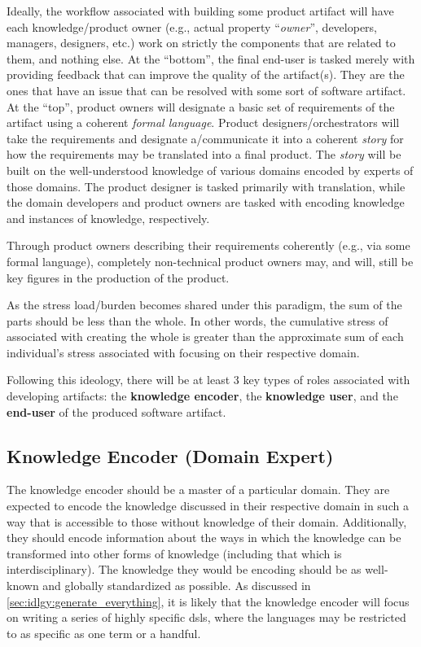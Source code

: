 Ideally, the workflow associated with building some product artifact will have
each knowledge/product owner (e.g., actual property ``\textit{owner}'',
developers, managers, designers, etc.) work on strictly the components that are
related to them, and nothing else. At the ``bottom'', the final end-user is
tasked merely with providing feedback that can improve the quality of the
artifact(s). They are the ones that have an issue that can be resolved with some
sort of software artifact. At the ``top'', product owners will designate a basic
set of requirements of the artifact using a coherent \textit{formal language}.
Product designers/orchestrators will take the requirements and designate
a/communicate it into a coherent \textit{story} for how the requirements may be
translated into a final product. The \textit{story} will be built on the
well-understood knowledge of various domains encoded by experts of those
domains. The product designer is tasked primarily with translation, while the
domain developers and product owners are tasked with encoding knowledge and
instances of knowledge, respectively.

Through product owners describing their requirements coherently (e.g., via some
formal language), completely non-technical product owners may, and will, still
be key figures in the production of the product.

As the stress load/burden becomes shared under this paradigm, the sum of the
parts should be less than the whole. In other words, the cumulative stress of
associated with creating the whole is greater than the approximate sum of each
individual's stress associated with focusing on their respective domain.

Following this ideology, there will be at least 3 key types of roles associated
with developing artifacts: the \textbf{knowledge encoder}, the \textbf{knowledge
    user}, and the \textbf{end-user} of the produced software artifact.

\subsection{Knowledge Encoder (Domain Expert)}

The knowledge encoder should be a master of a particular domain. They are
expected to encode the knowledge discussed in their respective domain in such a
way that is accessible to those without knowledge of their domain. Additionally,
they should encode information about the ways in which the knowledge can be
transformed into other forms of knowledge (including that which is
interdisciplinary). The knowledge they would be encoding should be as well-known
and globally standardized as possible. As discussed in
\autoref{sec:idlgy:generate_everything}, it is likely that the knowledge encoder
will focus on writing a series of highly specific \aclp{dsl}, where the
languages may be restricted to as specific as one term or a handful.

